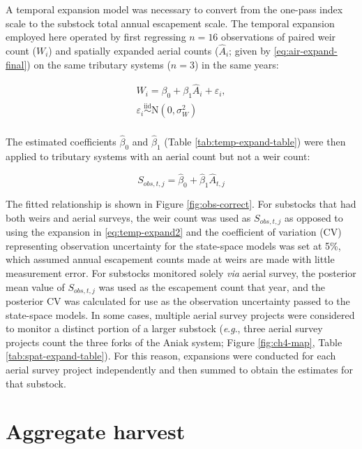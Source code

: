 \documentclass[12pt,]{book}
\theoremstyle{definition}
\theoremstyle{definition}
\theoremstyle{definition}
\theoremstyle{remark}
\begin{document}
\noindent
A temporal expansion model was necessary to convert from the one-pass
index scale to the substock total annual escapement scale. The temporal
expansion employed here operated by first regressing \(n = 16\)
observations of paired weir count (\(W_i\)) and spatially expanded
aerial counts (\(\hat{A}_{i}\); given by \eqref{eq:air-expand-final}) on
the same tributary systems (\(n = 3\)) in the same years:

\begin{equation}
  \begin{split}
    W_i = \beta_0 + \beta_1 \hat{A}_i + \varepsilon_i, \\
    \varepsilon_i \stackrel{\text{iid}}{\sim} \text{N}(0, \sigma_W^2) \\
  \end{split}
\label{eq:temp-expand1}
\end{equation}

The estimated coefficients \(\hat{\beta}_0\) and \(\hat{\beta}_1\)
(Table \ref{tab:temp-expand-table}) were then applied to tributary
systems with an aerial count but not a weir count:

\begin{equation}
  S_{obs,t,j}=\hat{\beta}_0 + \hat{\beta}_1 \hat{A}_{t,j}
\label{eq:temp-expand2}
\end{equation}

\noindent
The fitted relationship is shown in Figure \ref{fig:obs-correct}. For
substocks that had both weirs and aerial surveys, the weir count was
used as \(S_{obs,t,j}\) as opposed to using the expansion in
\eqref{eq:temp-expand2} and the coefficient of variation (CV) representing
observation uncertainty for the state-space models was set at 5\%, which
assumed annual escapement counts made at weirs are made with little
measurement error. For substocks monitored solely \emph{via} aerial
survey, the posterior mean value of \(S_{obs,t,j}\) was used as the
escapement count that year, and the posterior CV was calculated for use
as the observation uncertainty passed to the state-space models. In some
cases, multiple aerial survey projects were considered to monitor a
distinct portion of a larger substock (\emph{e}.\emph{g}., three aerial
survey projects count the three forks of the Aniak system; Figure
\ref{fig:ch4-map}, Table \ref{tab:spat-expand-table}). For this reason,
expansions were conducted for each aerial survey project independently
and then summed to obtain the estimates for that substock.

\section{Aggregate harvest}\label{harv-expansion}
\end{document}
